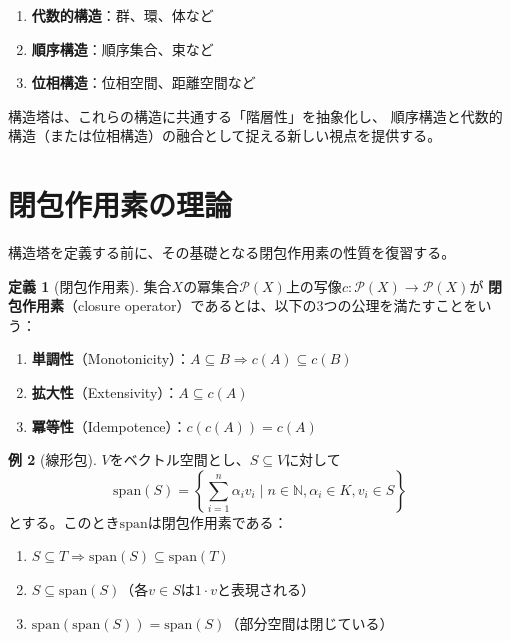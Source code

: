 \documentclass[a4paper,12pt]{ltjsarticle}
\theoremstyle{definition}
\newtheorem{definition}{定義}[section]
\newtheorem{example}[definition]{例}
\begin{document}
\begin{enumerate}
\item \textbf{代数的構造}：群、環、体など
\item \textbf{順序構造}：順序集合、束など
\item \textbf{位相構造}：位相空間、距離空間など
\end{enumerate}

構造塔は、これらの構造に共通する「階層性」を抽象化し、
順序構造と代数的構造（または位相構造）の融合として捉える新しい視点を提供する。

\section{閉包作用素の理論}

構造塔を定義する前に、その基礎となる閉包作用素の性質を復習する。

\begin{definition}[閉包作用素]
集合$X$の冪集合$\mathcal{P}(X)$上の写像$c: \mathcal{P}(X) \to \mathcal{P}(X)$が
\textbf{閉包作用素}（closure operator）であるとは、以下の3つの公理を満たすことをいう：

\begin{enumerate}[label=(\roman*)]
\item \textbf{単調性}（Monotonicity）：$A \subseteq B \Rightarrow c(A) \subseteq c(B)$
\item \textbf{拡大性}（Extensivity）：$A \subseteq c(A)$
\item \textbf{冪等性}（Idempotence）：$c(c(A)) = c(A)$
\end{enumerate}
\end{definition}

\begin{example}[線形包]
$V$をベクトル空間とし、$S \subseteq V$に対して
\[
\mathrm{span}(S) = \left\{ \sum_{i=1}^n \alpha_i v_i \mid n \in \mathbb{N}, \alpha_i \in K, v_i \in S \right\}
\]
とする。このとき$\mathrm{span}$は閉包作用素である：
\begin{enumerate}[label=(\roman*)]
\item $S \subseteq T \Rightarrow \mathrm{span}(S) \subseteq \mathrm{span}(T)$
\item $S \subseteq \mathrm{span}(S)$（各$v \in S$は$1 \cdot v$と表現される）
\item $\mathrm{span}(\mathrm{span}(S)) = \mathrm{span}(S)$（部分空間は閉じている）
\end{enumerate}
\end{example}
\end{document}
